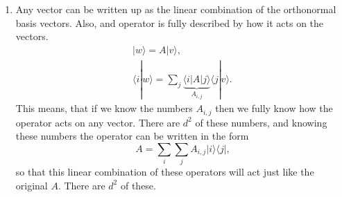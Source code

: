 \documentclass[a4paper,12pt]{article}
\newcommand{\la}{\langle}
\newcommand{\ra}{\rangle}
\begin{document}
\begin{enumerate}[label=(\roman*)]
        \item Any vector can be written up as the linear combination of the orthonormal basis vectors. Also, and operator is fully described by how it acts on the vectors.
            \begin{gather}
                \nonumber
                | w \ra = A | v \ra \textrm{,}\\
                \la i | w \ra = \sum_j \underbrace{\la i | A | j \ra}_{A_{i, j}} \la j | v \ra \textrm{.}
            \end{gather}
            This means, that if we know the numbers $A_{i, j}$ then we fully know how the operator acts on any vector. There are $d^2$ of these numbers, and knowing these numbers the operator can be written in the form
            \begin{equation}
                A = \sum_i \sum_j A_{i, j} | i \ra \la j | \textrm{,}
            \end{equation}
            so that this linear combination of these operators will act just like the original $A$.
            There are $d^2$ of these.


\end{enumerate}
\end{document}
